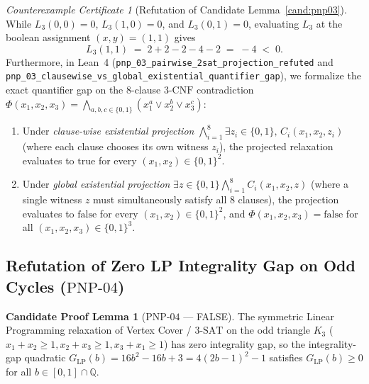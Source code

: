 \documentclass[11pt,a4paper]{article}
\theoremstyle{plain}
\theoremstyle{definition}
\newtheorem{candidate}[theorem]{Candidate Proof Lemma}
\theoremstyle{remark}
\newtheorem{counterexample}[theorem]{Counterexample Certificate}
\newcommand{\Q}{\mathbb{Q}}
\begin{document}
\begin{counterexample}[Refutation of Candidate Lemma~\ref{cand:pnp03}]
While $L_3(0, 0) = 0$, $L_3(1, 0) = 0$, and $L_3(0, 1) = 0$, evaluating $L_3$ at the boolean assignment $(x, y) = (1, 1)$ gives
\begin{equation}
  L_3(1, 1) \;=\; 2 + 2 - 2 - 4 - 2 \;=\; -4 \;<\; 0.
\end{equation}
Furthermore, in Lean~4 (\texttt{pnp\_03\_pairwise\_2sat\_projection\_refuted} and \texttt{pnp\_03\_clausewise\_vs\_global\_existential\_quantifier\_gap}), we formalize the exact quantifier gap on the 8-clause $3\text{-CNF}$ contradiction $\Phi(x_1, x_2, x_3) = \bigwedge_{a,b,c \in \{0,1\}} (x_1^a \lor x_2^b \lor x_3^c)$:
\begin{enumerate}
  \item Under \emph{clause-wise existential projection} $\bigwedge_{i=1}^{8} \exists z_i \in \{0,1\},\, C_i(x_1, x_2, z_i)$ (where each clause chooses its own witness $z_i$), the projected relaxation evaluates to $\mathrm{true}$ for every $(x_1, x_2) \in \{0, 1\}^2$.
  \item Under \emph{global existential projection} $\exists z \in \{0,1\} \bigwedge_{i=1}^{8} C_i(x_1, x_2, z)$ (where a single witness $z$ must simultaneously satisfy all 8 clauses), the projection evaluates to $\mathrm{false}$ for every $(x_1, x_2) \in \{0, 1\}^2$, and $\Phi(x_1, x_2, x_3) = \mathrm{false}$ for all $(x_1, x_2, x_3) \in \{0, 1\}^3$.
\end{enumerate}
\end{counterexample}

\subsection{Refutation of Zero LP Integrality Gap on Odd Cycles (\texorpdfstring{$\mathrm{PNP\text{-}04}$}{PNP-04})}

\begin{candidate}[$\mathrm{PNP\text{-}04}$ --- FALSE]\label{cand:pnp04}
The symmetric Linear Programming relaxation of Vertex Cover / $3\text{-SAT}$ on the odd triangle $K_3$ ($x_1 + x_2 \ge 1, x_2 + x_3 \ge 1, x_3 + x_1 \ge 1$) has zero integrality gap, so the integrality-gap quadratic $G_{\mathrm{LP}}(b) = 16b^2 - 16b + 3 = 4(2b - 1)^2 - 1$ satisfies $G_{\mathrm{LP}}(b) \ge 0$ for all $b \in [0, 1] \cap \Q$.
\end{candidate}
\end{document}

